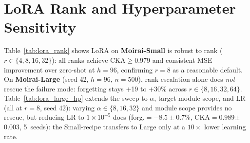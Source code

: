 \begin{table}[t]
\centering
\caption{\textbf{Condition E (LoRA, $r{=}8$, $\alpha{=}16$) on the eight Moirai
value-cells that lacked it.} All contrasts are held-out test MSE, normalised by
the cell's zero-shot test MSE, in percentage points; $\pm$ is SEM over the seeds
in the Seeds column. Sign convention matches B$-$D and B$-$H throughout:
\textbf{positive means full fine-tuning did worse than the comparison arm}. B$-$D
is recomputed on E's seeds, so it is comparable to B$-$E within a row and may
differ from the same cell's row in Table~\ref{tab:heldout_all}, which averages
that cell's full seed set. Parenthesised counts are the seeds sharing the mean's
sign. $\ell_2$ weight drift is exactly $0.0$ for every run and is not shown:
LoRA leaves the base parameters untouched by construction, which is why CKA, not
drift, is the representation measure here. Rows ordered by D$-$E.}
\label{tab:lora_valuecells}

\end{table}

\section{LoRA Rank and Hyperparameter Sensitivity}
\label{app:lora_rank}

Table~\ref{tab:lora_rank} shows LoRA on \textbf{Moirai-Small} is robust to
rank ($r \in \{4, 8, 16, 32\}$): all ranks achieve CKA$\geq$0.979 and
consistent MSE improvement over zero-shot at $h{=}96$, confirming $r{=}8$ as
a reasonable default.
On \textbf{Moirai-Large} (seed 42, $h{=}96$, $n{=}500$), rank escalation
alone does \emph{not} rescue the failure mode: forgetting stays $+$19 to
$+$30\% across $r \in \{8, 16, 32, 64\}$.
Table~\ref{tab:lora_large_hp} extends the sweep to $\alpha$, target-module
scope, and LR (all at $r{=}8$, seed 42): varying $\alpha \in \{8,16,32\}$ and
module scope provides no rescue, but reducing LR to $1{\times}10^{-5}$ does
(forg.$=-8.5\pm0.7\%$, CKA$=$0.989$\pm$0.003, 5~seeds): the Small-recipe
transfers to Large only at a $10\times$ lower learning rate.

